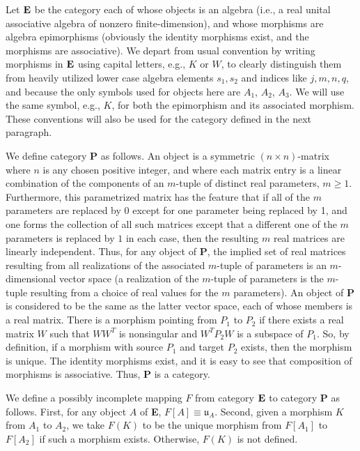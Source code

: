 \documentclass{amsart}
\numberwithin{equation}{section}
\theoremstyle{definition}
\numberwithin{theorem}{section}
\begin{document}
Let ${\bf E}$ be the category each of whose objects is an algebra (i.e., a real unital associative algebra of nonzero finite-dimension), and whose morphisms are algebra epimorphisms (obviously the identity morphisms exist, and the morphisms are associative).   We depart from usual convention by writing morphisms in ${\bf E}$ using capital letters, e.g., $K$ or $W$, to clearly distinguish them from heavily utilized lower case algebra elements $s_1,s_2$ and indices like $j,m,n,q$, and because the only symbols used for objects here are $A_1$, $A_2$, $A_3$. We will use the same symbol, e.g., $K$, for both the epimorphism and its associated morphism. These conventions will also be used for the category defined in the next paragraph.   

We define category {\bf P} as follows. An object is a symmetric $(n\times n)$-matrix where $n$ is any chosen positive integer, and where each matrix entry is a linear combination of the components of an $m$-tuple of distinct real parameters, $m\ge 1$.  Furthermore, this parametrized matrix has the feature that if all of the $m$ parameters are replaced by 0 except for one parameter being replaced by 1, and one forms the collection of all such matrices except that a different one of the $m$ parameters is replaced by $1$ in each case, then the resulting $m$ real matrices are linearly independent.  Thus, for any object of {\bf P}, the implied set of real matrices resulting from all realizations of the associated $m$-tuple of parameters is an $m$-dimensional vector space (a realization of the $m$-tuple of parameters is the $m$-tuple resulting from a choice of real values for the $m$ parameters).  An object of {\bf P} is considered to be the same as the latter vector space, each of whose members is a real matrix.   There is a morphism pointing from $P_1$ to $P_2$ if there exists a real matrix $W$ such that $WW^T$ is nonsingular and $W^TP_2W$ is a subspace of $P_1$.   So, by definition, if a morphism with source $P_1$ and target $P_2$ exists, then the morphism is unique.
The identity morphisms exist, and it is easy to see that composition of morphisms is associative.  Thus, {\bf P} is a category.

We define a possibly incomplete mapping $F$ from category ${\bf E}$ to category {\bf P} as follows.  First, for any object $A$ of {\bf E}, $F[
A] \equiv \mathfrak{u}_A$.  Second, given a morphism $K$ from $A_1$ to $A_2$, we take $F(K)$ to be the unique morphism from $F[A_1]$ to $F[A_2]$ if such a morphism exists. Otherwise, $F(K)$ is not defined.   
\end{document}
